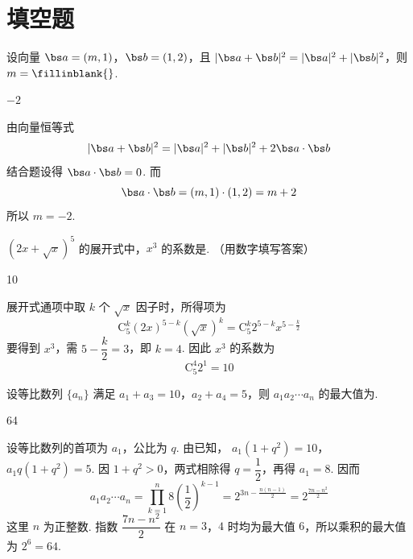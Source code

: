 \section{填空题}

\begin{problem}
设向量 \(\bs a=(m,1)\)，\(\bs b=(1,2)\)，且 \(|\bs a+\bs b|^2=|\bs a|^2+|\bs b|^2\)，则 \(m=\fillinblank{}\).
\end{problem}

\begin{answer}
\(-2\)
\end{answer}

\begin{solution}
由向量恒等式
\[
|\bs a+\bs b|^2=|\bs a|^2+|\bs b|^2+2\bs a\cdot\bs b
\]
结合题设得 \(\bs a\cdot\bs b=0\). 而
\[
\bs a\cdot\bs b=(m,1)\cdot(1,2)=m+2
\]
所以 \(m=-2\).
\end{solution}



\begin{problem}
\(\left(2x+\sqrt{x}\right)^5\) 的展开式中，\(x^3\) 的系数是\fillinblank{}. （用数字填写答案）
\end{problem}

\begin{answer}
10
\end{answer}

\begin{solution}
展开式通项中取 \(k\) 个 \(\sqrt{x}\) 因子时，所得项为
\[
\mathrm C_5^k(2x)^{5-k}(\sqrt{x})^k
=\mathrm C_5^k2^{5-k}x^{5-\frac{k}{2}}
\]
要得到 \(x^3\)，需 \(5-\dfrac k2=3\)，即 \(k=4\). 因此 \(x^3\) 的系数为
\[
\mathrm C_5^4 2^1=10
\]
\end{solution}



\begin{problem}
设等比数列 \(\{a_n\}\) 满足 \(a_1+a_3=10\)，\(a_2+a_4=5\)，则 \(a_1a_2\cdots a_n\) 的最大值为\fillinblank{}.
\end{problem}

\begin{answer}
64
\end{answer}

\begin{solution}
设等比数列的首项为 \(a_1\)，公比为 \(q\). 由已知，
\(a_1(1+q^2)=10\)，\(a_1q(1+q^2)=5\).
因 \(1+q^2>0\)，两式相除得 \(q=\dfrac12\)，再得 \(a_1=8\). 因而
\[
a_1a_2\cdots a_n=\prod_{k=1}^n8\left(\frac12\right)^{k-1}
=2^{3n-\frac{n(n-1)}2}=2^{\frac{7n-n^2}{2}}
\]
这里 \(n\) 为正整数. 指数 \(\dfrac{7n-n^2}{2}\) 在 \(n=3\)，\(4\) 时均为最大值 \(6\)，所以乘积的最大值为 \(2^6=64\).
\end{solution}



